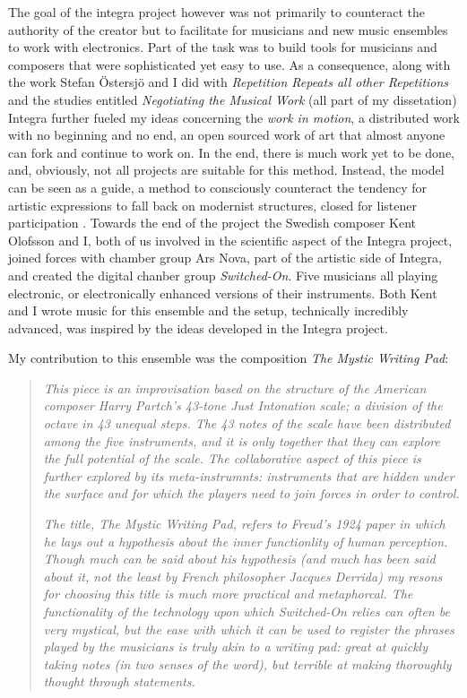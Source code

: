 \documentclass[a4paper]{article}
\begin{document}
The goal of the integra project however was not primarily to counteract the authority of the creator but to facilitate for musicians and new music ensembles to work with electronics. Part of the task was to build tools for musicians and composers that were sophisticated yet easy to use. As a consequence, along with the work Stefan Östersjö and I did with \emph{Repetition Repeats all other Repetitions} and the studies entitled \emph{Negotiating the Musical Work} (all part of my dissetation) Integra further fueled my ideas concerning the \emph{work in motion}, a distributed work with no beginning and no end, an open sourced work of art that almost anyone can fork and continue to work on. In the end, there is much work yet to be done, and, obviously, not all projects are suitable for this method. Instead, the model can be seen as a guide, a method to consciously counteract the tendency for artistic expressions to fall back on modernist structures, closed for listener participation \cite[A collaborate paper on Repetition is in print along with a recording of a new version of the piece.][]{friskcoessens2013}. Towards the end of the project the Swedish composer Kent Olofsson and I, both of us involved in the scientific aspect of the Integra project, joined forces with chamber group Ars Nova, part of the artistic side of Integra, and created the digital chanber group \emph{Switched-On}. Five musicians all playing electronic, or electronically enhanced versions of their instruments. Both Kent and I wrote music for this ensemble and the setup, technically incredibly advanced, was inspired by the ideas developed in the Integra project. 

My contribution to this ensemble was the composition \emph{The Mystic Writing Pad}: 

\begin{quote}
\emph{This piece is an improvisation based on the structure of the American composer Harry Partch's 43-tone Just Intonation scale; a division of the octave in 43 unequal steps. The 43 notes of the scale have been distributed among the five instruments, and it is only together that they can explore the full potential of the scale. The collaborative aspect of this piece is further explored by its meta-instrumnts: instruments that are hidden under the surface and for which the players need to join forces in order to control.}

\emph{The title, The Mystic Writing Pad, refers to Freud's 1924 paper in which he lays out a hypothesis about the inner functionlity of human perception. Though much can be said about his hypothesis (and much has been said about it, not the least by French philosopher Jacques Derrida) my resons for choosing this title is much more practical and metaphorcal. The functionality of the technology upon which Switched-On relies can often be very mystical, but the ease with which it can be used to register the phrases played by the musicians is truly akin to a writing pad: great at quickly taking notes (in two senses of the word), but terrible at making thoroughly thought through statements.} \cite[][(Program note)]{frisk-mystic}
\end{quote}
\end{document}
